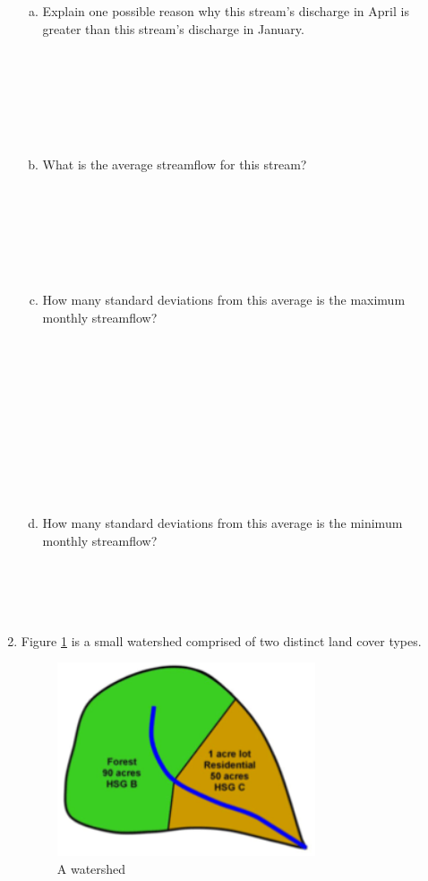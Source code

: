 \documentclass[12pt]{article}
\begin{document}
\begin{enumerate}
\begin{enumerate}[a)]
\item Explain one possible reason why this stream’s discharge in April is greater than this stream’s discharge in January.\\
~\\
~\\
~\\
~\\
~\\
~\\
\item What is the average streamflow for this stream?\\
~\\
~\\
~\\
~\\
~\\
~\\
\item How many standard deviations from this average is the maximum monthly streamflow?\\
~\\
~\\
~\\
~\\
~\\
~\\
~\\
~\\
~\\
~\\
\item How many standard deviations from this average is the minimum monthly streamflow?\\
~\\
~\\
~\\
~\\
\end{enumerate}
\clearpage
\item Figure \ref{fig:watershed} is a small watershed comprised of two distinct land cover types.

\begin{figure}[h!] %
   \centering
   \includegraphics[width=3in]{watershed.png} 
   \caption{A watershed}
   \label{fig:watershed}
\end{figure}


\end{enumerate}
\end{document}
